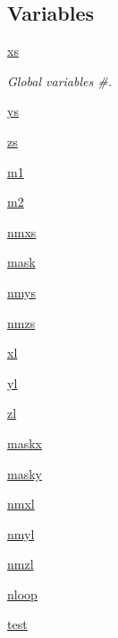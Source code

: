 \subsection*{Variables}
\begin{DoxyCompactItemize}
\item 
\hyperlink{namespacenumpy_1_1ma_1_1bench_abbf981f32817a2dc4ec6406bf324035a}{xs}
\begin{DoxyCompactList}\small\item\em Global variables \#. \end{DoxyCompactList}\item 
\hyperlink{namespacenumpy_1_1ma_1_1bench_a406865ea1ac13fac23e31d14de177579}{ys}
\item 
\hyperlink{namespacenumpy_1_1ma_1_1bench_a91b628fe2d34430a1bdeaea2e94cac91}{zs}
\item 
\hyperlink{namespacenumpy_1_1ma_1_1bench_ab741d40c32560e3e9a61b395a6f4508f}{m1}
\item 
\hyperlink{namespacenumpy_1_1ma_1_1bench_a0b1ba97e6a9c9e0e0b23605fd60a718d}{m2}
\item 
\hyperlink{namespacenumpy_1_1ma_1_1bench_ade94ef9dc31fe069bf5d359e7280e523}{nmxs}
\item 
\hyperlink{namespacenumpy_1_1ma_1_1bench_ac49e5d349ab00e63625530c20eaebb8d}{mask}
\item 
\hyperlink{namespacenumpy_1_1ma_1_1bench_afceae3eb4c0e9e3f6e80a6d7f15d414d}{nmys}
\item 
\hyperlink{namespacenumpy_1_1ma_1_1bench_ad9161bcb9a62ce5dbe918feab98484fc}{nmzs}
\item 
\hyperlink{namespacenumpy_1_1ma_1_1bench_aa633d91568b1f05d8931d11d0732e618}{xl}
\item 
\hyperlink{namespacenumpy_1_1ma_1_1bench_af4545282f92a9aeeb4535848320255c9}{yl}
\item 
\hyperlink{namespacenumpy_1_1ma_1_1bench_a7dee4fdc6bff22d2e24f4db3cd452b84}{zl}
\item 
\hyperlink{namespacenumpy_1_1ma_1_1bench_a9a7d0869b9479dd968c672fae424189d}{maskx}
\item 
\hyperlink{namespacenumpy_1_1ma_1_1bench_a626d1462326153c2404e6504942d2aef}{masky}
\item 
\hyperlink{namespacenumpy_1_1ma_1_1bench_a8fcb5f226ee57f4211051c4f3103d7e7}{nmxl}
\item 
\hyperlink{namespacenumpy_1_1ma_1_1bench_a2d02f567c4898191b5f5ad23393220e8}{nmyl}
\item 
\hyperlink{namespacenumpy_1_1ma_1_1bench_a38f3df5ad8221fed56107faec62a5de2}{nmzl}
\item 
\hyperlink{namespacenumpy_1_1ma_1_1bench_af7a867224403545e05051da6073c5e05}{nloop}
\item 
\hyperlink{namespacenumpy_1_1ma_1_1bench_add079dcba3ec6892ce141568ede6ced5}{test}
\end{DoxyCompactItemize}


